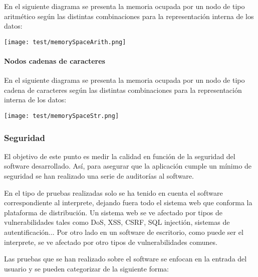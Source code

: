 En el siguiente diagrama se presenta la memoria ocupada por un nodo de tipo aritmético según las distintas combinaciones para la representación interna de los datos:

\begin{center}
\texttt{[image: test/memorySpaceArith.png]} 
\end{center}

\pagebreak 
\paragraph{Nodos cadenas de caracteres}

En el siguiente diagrama se presenta la memoria ocupada por un nodo de tipo cadena de caracteres según las distintas combinaciones para la representación interna de los datos:

\begin{center}
\texttt{[image: test/memorySpaceStr.png]} 
\end{center}

\subsubsection{Seguridad}

El objetivo de
este punto es medir la calidad en función de la seguridad del software desarrollado. Así, para asegurar que la aplicación cumple un mínimo de seguridad se han realizado una serie de 
auditorías al software. 

En el tipo de pruebas realizadas solo se ha tenido en cuenta el software correspondiente al interprete, dejando fuera todo el sistema web que conforma la plataforma de distribución. Un 
sistema web se ve afectado por tipos de vulnerabilidades tales como DoS, XSS, CSRF, SQL injectión, sistemas de autentificación... Por otro lado en un software de escritorio, como 
puede ser el interprete, se ve afectado por otro tipos de vulnerabilidades comunes.

Las pruebas que se han realizado sobre el software se enfocan en la entrada del usuario y se pueden categorizar de la siguiente forma:

